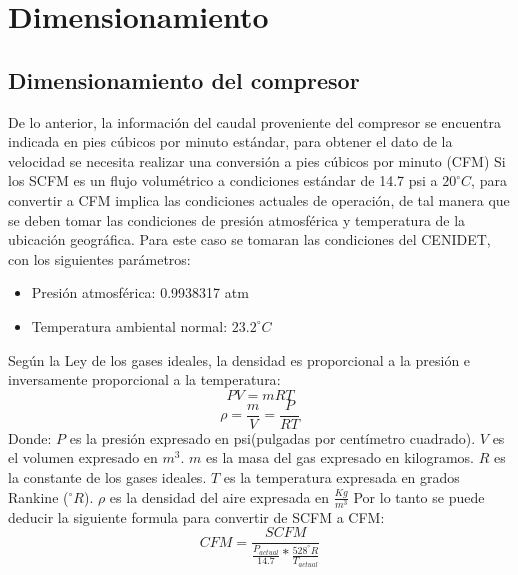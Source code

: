 \chapter{Dimensionamiento}

\section{Dimensionamiento del compresor}
De lo anterior, la informaci\'on del caudal proveniente del compresor se encuentra indicada en pies c\'ubicos por minuto estándar, para obtener el dato de la velocidad se necesita realizar una conversi\'on a pies cúbicos por minuto (CFM)
\newline
Si los SCFM es un flujo volum\'etrico a condiciones estándar de 14.7 psi a $20^\circ C$, para convertir a CFM implica las condiciones actuales de operaci\'on, de tal manera que se deben tomar las condiciones de presi\'on atmosférica y temperatura de la ubicación geográfica. Para este caso se tomaran las condiciones del CENIDET, con los siguientes parámetros:
\begin{itemize}
	\item Presión atmosférica: 0.9938317 atm
	\item Temperatura ambiental normal: $23.2^\circ C$
\end{itemize}
Según la Ley de los gases ideales, la densidad es proporcional a la presión e inversamente proporcional a la temperatura\cite{Cengel2022}:
\begin{equation}
	PV=mRT
\end{equation}
\begin{equation}
	\rho=\frac{m}{V}=\frac{P}{RT}
\end{equation}
Donde:
\newline
$P$ es la presión expresado en psi(pulgadas por centímetro cuadrado).
\newline
$V$ es el volumen expresado en $m^3$.
\newline
$m$ es la masa del gas expresado en kilogramos.
\newline
$R$ es la constante de los gases ideales.
\newline
$T$ es la temperatura expresada en grados Rankine ($^\circ R$).
\newline
$\rho$ es la densidad del aire expresada en $\frac{Kg}{m^3}$
\newline
Por lo tanto se puede deducir la siguiente formula para convertir de SCFM a CFM:
\begin{equation}
	CFM=\frac{SCFM}{\frac{P_{actual}}{14.7}*\frac{528^\circ R}{T_{actual}}}
\end{equation}
